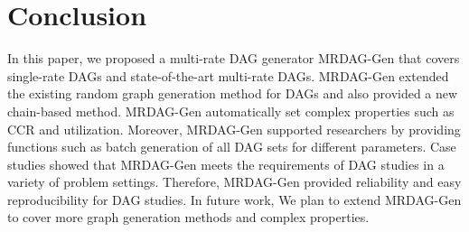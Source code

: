 \section{Conclusion}
\label{sec: conclusion}

In this paper, we proposed a multi-rate DAG generator MRDAG-Gen that covers single-rate DAGs and state-of-the-art multi-rate DAGs.
MRDAG-Gen extended the existing random graph generation method for DAGs and also provided a new chain-based method.
MRDAG-Gen automatically set complex properties such as CCR and utilization.
Moreover, MRDAG-Gen supported researchers by providing functions such as batch generation of all DAG sets for different parameters.
Case studies showed that MRDAG-Gen meets the requirements of DAG studies in a variety of problem settings.
Therefore, MRDAG-Gen provided reliability and easy reproducibility for DAG studies.
In future work, We plan to extend MRDAG-Gen to cover more graph generation methods and complex properties.
